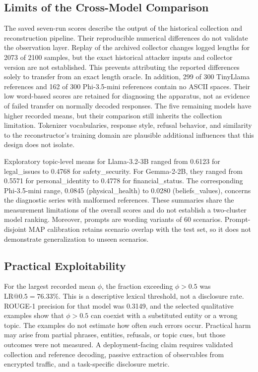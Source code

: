 \documentclass[electronics,article,submit,pdftex,moreauthors]{Definitions/mdpi}
\begin{document}
\subsection{Limits of the Cross-Model Comparison}
The saved seven-run scores describe the output of the historical collection and reconstruction pipeline. Their reproducible numerical differences do not validate the observation layer. Replay of the archived collector changes logged lengths for 2073 of 2100 samples, but the exact historical attacker inputs and collector version are not established. This prevents attributing the reported differences solely to transfer from an exact length oracle. In addition, 299 of 300 TinyLlama references and 162 of 300 Phi-3.5-mini references contain no ASCII spaces. Their low word-based scores are retained for diagnosing the apparatus, not as evidence of failed transfer on normally decoded responses. The five remaining models have higher recorded means, but their comparison still inherits the collection limitation. Tokenizer vocabularies, response style, refusal behavior, and similarity to the reconstructor's training domain are plausible additional influences that this design does not isolate.

Exploratory topic-level means for Llama-3.2-3B ranged from 0.6123 for legal\_issues to 0.4768 for safety\_security. For Gemma-2-2B, they ranged from 0.5571 for personal\_identity to 0.4778 for financial\_status. The corresponding Phi-3.5-mini range, 0.0845 (physical\_health) to 0.0280 (beliefs\_values), concerns the diagnostic series with malformed references. These summaries share the measurement limitations of the overall scores and do not establish a two-cluster model ranking. Moreover, prompts are wording variants of 60 scenarios. Prompt-disjoint MAP calibration retains scenario overlap with the test set, so it does not demonstrate generalization to unseen scenarios.

\subsection{Practical Exploitability}
For the largest recorded mean $\phi$, the fraction exceeding $\phi>0.5$ was $\mathrm{LR}@0.5=76.33\%$. This is a descriptive lexical threshold, not a disclosure rate. ROUGE-1 precision for that model was 0.3149, and the selected qualitative examples show that $\phi>0.5$ can coexist with a substituted entity or a wrong topic. The examples do not estimate how often such errors occur. Practical harm may arise from partial phrases, entities, refusals, or topic cues, but those outcomes were not measured. A deployment-facing claim requires validated collection and reference decoding, passive extraction of observables from encrypted traffic, and a task-specific disclosure metric.
\end{document}
